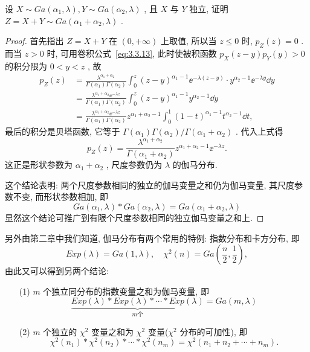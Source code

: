    \begin{example}[(伽玛分布的可加性)]\label{exam:3.3.7}
   	设 $X\sim Ga(\alpha_1,\lambda),Y\sim Ga(\alpha_2,\lambda)$ , 且 $X$ 与 $Y$ 独立, 证明 $Z=X+Y\sim Ga(\alpha_1+\alpha_2,\lambda)$ .
   	\begin{proof}
   		首先指出 $Z=X+Y$ 在 $(0,+\infty)$ 上取值, 所以当 $z\leqslant0$ 时, $p_{Z}(z)=0$ . 而当 $z>0$ 时, 可用卷积公式~\ref{eq:3.3.13}, 此时使被积函数 $p_{X}(z-y)p_{Y}(y)>0$ 的积分限为 $0<y<z$ , 故
   		\begin{align*}
   			p_{Z}(z)&=\frac{\lambda^{\alpha_1+\alpha_2}}{\Gamma(\alpha_1)\Gamma(\alpha_2)}\int_{0}^{z}(z-y)^{\alpha_1-1}\ee^{-\lambda(z-y)}\cdot y^{\alpha_2-1}\ee^{-\lambda y}\dd y\\
   			&=\frac{\lambda^{\alpha_1+\alpha_2}\ee^{-\lambda z}}{\Gamma(\alpha_1)\Gamma(\alpha_2)}\int_{0}^{z}(z-y)^{\alpha_1-1}y^{\alpha_2-1}\dd y\\
   			&=\frac{\lambda^{\alpha_1+\alpha_2}\ee^{-\lambda z}}{\Gamma(\alpha_1)\Gamma(\alpha_2)}z^{\alpha_1+\alpha_2-1}\int_{0}^{1}(1-t)^{\alpha_1-1}t^{\alpha_2-1}\dd t,
   		\end{align*}
   		最后的积分是贝塔函数, 它等于 $\Gamma(\alpha_1)\Gamma(\alpha_2)/\Gamma(\alpha_1+\alpha_2)$ . 代入上式得
   		\begin{equation*}
   			p_{Z}(z)=\frac{\lambda^{\alpha_1+\alpha_2}}{\Gamma(\alpha_1+\alpha_2)}z^{\alpha_1+\alpha_2-1}\ee^{-\lambda z}.
   		\end{equation*}
   		这正是形状参数为 $\alpha_1+\alpha_2$ , 尺度参数仍为 $\lambda$ 的伽马分布.
   		
   		这个结论表明: 两个尺度参数相同的独立的伽马变量之和仍为伽马变量, 其尺度参数不变, 而形状参数相加, 即
   		\begin{equation}\label{eq:3.3.16}
   			Ga(\alpha_1,\lambda)\ast Ga(\alpha_2,\lambda)=Ga(\alpha_1+\alpha_2,\lambda)
   		\end{equation}
   		显然这个结论可推广到有限个尺度参数相同的独立伽马变量之和上.
   	\end{proof}
   	另外由第二章中我们知道, 伽马分布有两个常用的特例: 指数分布和卡方分布, 即
   	\begin{equation*}
   	Exp(\lambda)=Ga(1,\lambda),\quad\chi^2(n)=Ga\left( \frac{n}{2},\frac{1}{2}\right), 
   	\end{equation*}
   	由此又可以得到另两个结论:
   	\begin{itemize}
   		\item[(1)] $m$ 个独立同分布的指数变量之和为伽马变量, 即
   		\begin{equation}\label{eq:3.3.17}
   		\underbrace{Exp(\lambda)\ast Exp(\lambda)\ast\cdots\ast Exp(\lambda)}_{m\text{个}}=Ga(m,\lambda)
   		\end{equation}
   		\item[(2)] $m$ 个独立的 $\chi^2$ 变量之和为 $\chi^2$ 变量($\chi^2$ 分布的可加性), 即
   		\begin{equation}\label{eq:3.3.18}
   		\chi^2(n_1)\ast\chi^2(n_2)\ast\cdots\ast\chi^2(n_m)=\chi^2(n_1+n_2+\cdots+n_m).
   		\end{equation}
   	\end{itemize}
   \end{example}
